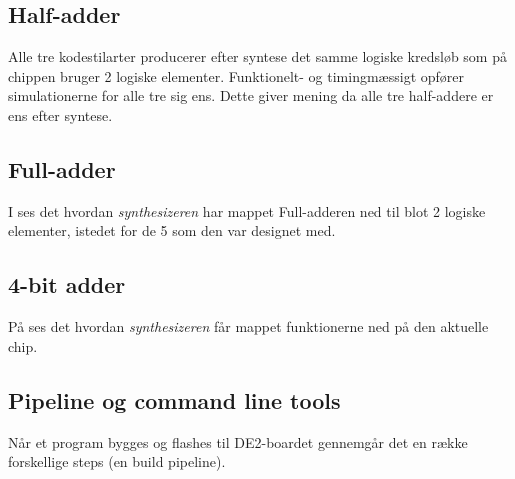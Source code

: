 
\subsection{Half-adder}

Alle tre kodestilarter producerer efter syntese det samme logiske kredsløb som
på chippen bruger 2 logiske elementer. Funktionelt- og timingmæssigt opfører
simulationerne for alle tre sig ens. Dette giver mening da alle tre half-addere
er ens efter syntese.

\subsection{Full-adder}

I  ses det hvordan \emph{synthesizeren} har mappet Full-adderen ned til blot 2 logiske elementer, istedet for de 5 som den var designet med.


\subsection{4-bit adder}



På  ses det hvordan \emph{synthesizeren} får mappet funktionerne ned på den aktuelle chip.

\subsection{Pipeline og command line tools}

Når et program bygges og flashes til DE2-boardet gennemgår det en række
forskellige steps (en build pipeline).

